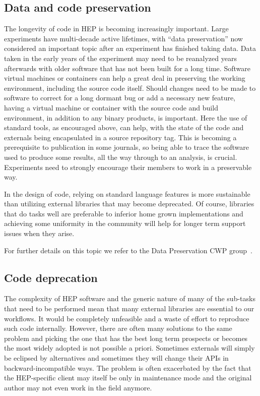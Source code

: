 \documentclass[12pt,a4paper]{article}
\begin{document}
\hypertarget{data-and-code-preservation}{%
\subsection{Data and code
preservation}\label{data-and-code-preservation}}

The longevity of code in HEP is becoming increasingly important. Large
experiments have multi-decade active lifetimes, with ``data
preservation'' now considered an important topic after an experiment has
finished taking data. Data taken in the early years of the experiment
may need to be reanalyzed years afterwards with older software that has
not been built for a long time. Software virtual machines or containers
can help a great deal in preserving the working environment, including
the source code itself. Should changes need to be made to software to
correct for a long dormant bug or add a necessary new feature, having a
virtual machine or container with the source code and build environment,
in addition to any binary products, is important. Here the use of
standard tools, as encouraged above, can help, with the state of the
code and externals being encapsulated in a source repository tag. This
is becoming a prerequisite to publication in some journals, so being
able to trace the software used to produce some results, all the way
through to an analysis, is crucial. Experiments need to strongly
encourage their members to work in a preservable way.

In the design of code, relying on standard language features is more
sustainable than utilizing external libraries that may become
deprecated. Of course, libraries that do tasks well are preferable to
inferior home grown implementations and achieving some uniformity in the
community will help for longer term support issues when they arise.

For further details on this topic we refer to the Data Preservation CWP
group~\cite{HSF-CWP-2017-06}.

\hypertarget{code-deprecation}{%
\subsection{Code deprecation}\label{code-deprecation}}

The complexity of HEP software and the generic nature of many of the
sub-tasks that need to be performed mean that many external libraries
are essential to our workflows. It would be completely unfeasible and a
waste of effort to reproduce such code internally. However, there are
often many solutions to the same problem and picking the one that has
the best long term prospects or becomes the most widely adopted is not
possible a priori. Sometimes externals will simply be eclipsed by
alternatives and sometimes they will change their APIs in
backward-incompatible ways. The problem is often exacerbated by the fact
that the HEP-specific client may itself be only in maintenance mode and
the original author may not even work in the field anymore.~
\end{document}
